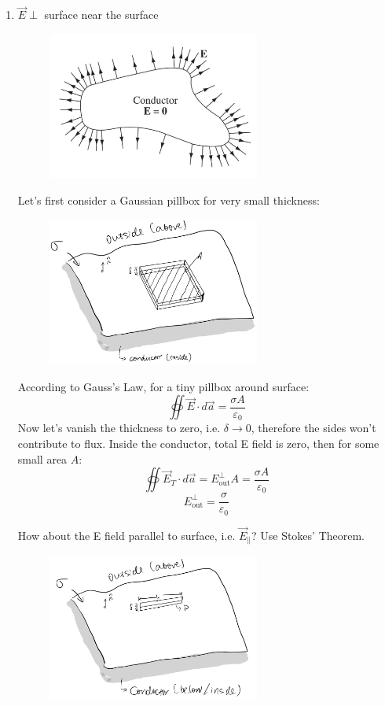 \documentclass[12pt,a4paper,twoside]{article}
\numberwithin{equation}{section}
\begin{document}
\begin{enumerate}
        \item \(\overrightarrow{E}\perp\) surface near the surface
        \begin{figure}[ht]
            \centering
            \includegraphics[width=7cm]{250-Revision/fig-2.43.png}
            \label{fig:2.43}
        \end{figure}
        
        Let's first consider a Gaussian pillbox for very small thickness:
        \begin{figure}[ht]
            \centering
            \includegraphics[width=7cm]{250-Revision/gaussian-pillbox-conductor.png}
        \end{figure}
        
        According to Gauss's Law, for a tiny pillbox around surface:
        \[\oiint \overrightarrow{E}\cdot d\overrightarrow{a}=\frac{\sigma A}{\varepsilon_0}\]
        Now let's vanish the thickness to zero, i.e. $\delta\to 0$, therefore the sides won't contribute to flux.
        Inside the conductor, total E field is zero, then for some small area $A$:
        \[\oiint \overrightarrow{E}_{T}\cdot d\overrightarrow{a}=E^{\perp}_{\mathrm{out}}A=\frac{\sigma A}{\varepsilon_0}\]
        \[E^{\perp}_{\mathrm{out}}=\frac{\sigma}{\varepsilon_0}\]
        
        How about the E field parallel to surface, i.e. $\overrightarrow{E}_\parallel$? Use Stokes' Theorem.
        \begin{figure}[ht]
            \centering
            \includegraphics[width=7cm]{250-Revision/gaussian-pillbox-conductor-2.png}
        \end{figure}
        

\end{enumerate}
\end{document}
